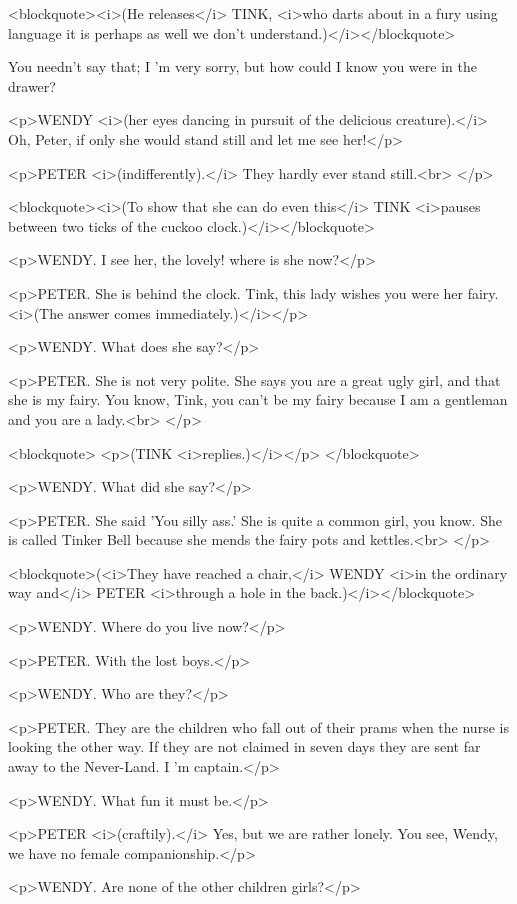 <blockquote><i>(He releases</i> TINK, <i>who darts about in a fury
using language it is perhaps as well we don't
understand.)</i></blockquote>

You needn't say that; I 'm very sorry, but how could I know you were
in the drawer? 

<p>WENDY <i>(her eyes dancing in pursuit of the delicious
creature).</i> Oh, Peter, if only she would stand still and let me
see her!</p>

<p>PETER <i>(indifferently).</i> They hardly ever stand still.<br>
</p>

<blockquote><i>(To show that she can do even this</i> TINK <i>pauses
between two ticks of the cuckoo clock.)</i></blockquote>

<p>WENDY. I see her, the lovely! where is she now?</p>

<p>PETER. She is behind the clock. Tink, this lady wishes you were
her fairy. <i>(The answer comes immediately.)</i></p>

<p>WENDY. What does she say?</p>

<p>PETER. She is not very polite. She says you are a great ugly girl,
and that she is my fairy. You know, Tink, you can't be my fairy
because I am a gentleman and you are a lady.<br>
</p>

<blockquote>
<p>(TINK <i>replies.)</i></p>
</blockquote>

<p>WENDY. What did she say?</p>

<p>PETER. She said 'You silly ass.' She is quite a common girl, you
know. She is called Tinker Bell because she mends the fairy pots and
kettles.<br>
</p>

<blockquote>(<i>They have reached a chair,</i> WENDY <i>in the
ordinary way and</i> PETER <i>through a hole in the
back.)</i></blockquote>

<p>WENDY. Where do you live now?</p>

<p>PETER. With the lost boys.</p>

<p>WENDY. Who are they?</p>

<p>PETER. They are the children who fall out of their prams when the
nurse is looking the other way. If they are not claimed in seven days
they are sent far away to the Never-Land. I 'm captain.</p>

<p>WENDY. What fun it must be.</p>

<p>PETER <i>(craftily).</i> Yes, but we are rather lonely. You see,
Wendy, we have no female companionship.</p>

<p>WENDY. Are none of the other children girls?</p>

